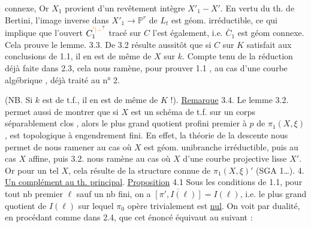 connexe,  Or $X_1$ provient d'un revêtement   intègre   $X'_1-X'$. En vertu du th. de Bertini, l'image inverse  dans $X'_1\longrightarrow\mathbb P^r$  de $L_t$ est  géom. irréductible, ce qui implique que l'ouvert $C_1^{\unsure{'|-}}$ tracé sur $C$ l'est également, i.e. $\bar C_1$ est géom connexe. Cela prouve le lemme.
3.3. De 3.2 résulte aussitôt que si  $C$ sur $K$ satisfait aux conclusions de 1.1, il en est de même de $X$ sur $k$. Compte tenu de la réduction déjà faite dans 2.3, cela nous ramène, pour prouver 1.1 , au cas d'une courbe algébrique , déjà traité au n° 2.

(NB. Si $k$ est de t.f., il en est de même de $K$ !).
\uline{Remarque} 3.4. Le lemme 3.2. permet aussi de montrer que si $X$ est un schéma de t.f. sur un corps séparablement clos , alors le  plus grand  quotient profini premier à $p$ de $\pi_1(X,\xi)$,  est topologique à engendrement fini. En effet, la théorie de la descente  nous permet de nous ramener au cas où $X$ est géom. unibranche irréductible,  puis au cas  $X$ affine, puis 3.2. nous ramène au cas où $X$   d'une courbe projective lisse $X'$. Or pour un tel $X$, cela résulte de la structure connue de $\pi_1(X,\xi)'$ (SGA 1\ldots).
4. \uline{Un complément au th. principal}.
\uline{Proposition} 4.1 Sous les conditions de 1.1, pour tout \deleted{\unsure{$\ell$}} nb premier $\ell$ sauf un nb fini,  \deleted{\unsure{$\pi$}} on a $\overline{[\pi',I(\ell)]}=I(\ell)$, i.e. le plus grand quotient  de $I(\ell)$ sur lequel $\pi_0$ opère trivialement est \uline{nul}.
On voit par dualité, en procédant comme dans 2.4, que cet énoncé équivaut au suivant :

